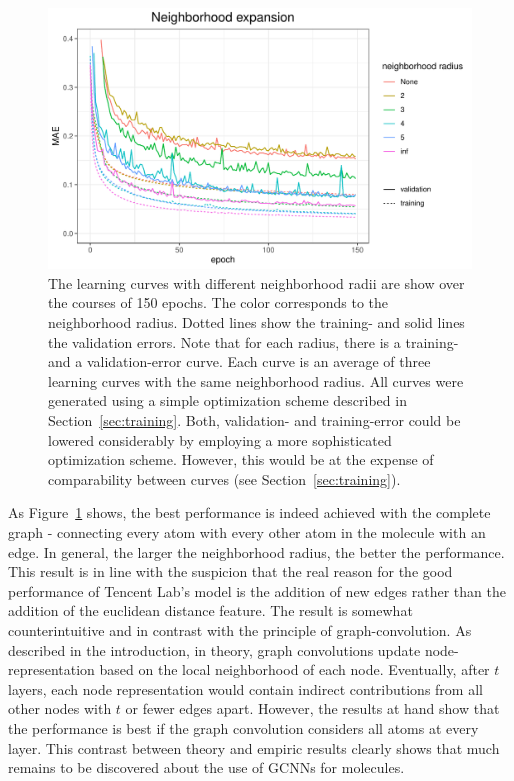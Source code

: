 \begin{figure}[H]
	\includegraphics[width=\linewidth]{figures/neighborhood-expansion}
	
	\caption{The learning curves with different neighborhood radii are show over the courses of 150 epochs. The color corresponds to the neighborhood radius. Dotted lines show the training- and solid lines the validation errors. Note that for each radius, there is a training- and a validation-error curve. Each curve is an average of three learning curves with the same neighborhood radius. All curves were generated using a simple optimization scheme described in Section~\ref{sec:training}. Both, validation- and training-error could be lowered considerably by employing a more sophisticated optimization scheme. However, this would be at the expense of comparability between curves (see Section~\ref{sec:training}).}
	\label{fig:neighborhood-expansion}
\end{figure}

As Figure~\ref{fig:neighborhood-expansion} shows, the best performance is indeed achieved with the complete graph - connecting every atom with every other atom in the molecule with an edge. In general, the larger the neighborhood radius, the better the performance. This result is in line with the suspicion that the real reason for the good performance of Tencent Lab's model is the addition of new edges rather than the addition of the euclidean distance feature.
The result is somewhat counterintuitive and in contrast with the principle of graph-convolution. As described in the introduction, in theory, graph convolutions update node-representation based on the local neighborhood of each node. Eventually, after $t$ layers, each node representation would contain indirect contributions from all other nodes with $t$ or fewer edges apart. However, the results at hand show that the performance is best if the graph convolution considers all atoms at every layer. This contrast between theory and empiric results clearly shows that much remains to be discovered about the use of GCNNs for molecules.

